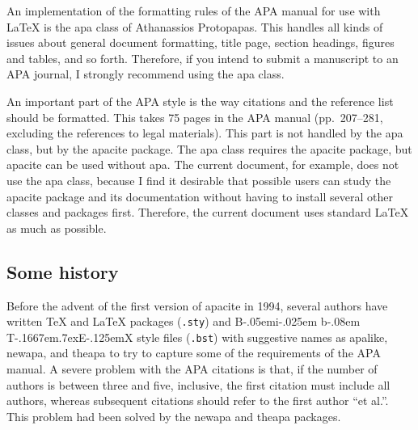 \documentclass{article}
\def\BibTeX{{\rm B\kern-.05em{\sc i\kern-.025em b}\kern-.08em
    T\kern-.1667em\lower.7ex\hbox{E}\kern-.125emX}}%
\newcommand{\pkg}[1]{\textsf{#1}}%
\newcommand{\fname}[1]{\texttt{#1}}%
\begin{document}
An implementation of the formatting rules of the APA manual for use with
\LaTeX{} is the \pkg{apa} class of Athanassios Protopapas. This handles all
kinds of issues about general document formatting, title page, section
headings, figures and tables, and so forth. Therefore, if you intend to submit
a manuscript to an APA journal, I strongly recommend using the \pkg{apa}
class.

An important part of the APA style is the way citations and the reference list
should be formatted. This takes 75 pages in the APA manual (pp.~207--281,
excluding the references to legal materials). This part is not handled by the
\pkg{apa} class, but by the \pkg{apacite} package. The \pkg{apa} class
requires the \pkg{apacite} package, but \pkg{apacite} can be used without
\pkg{apa}. The current document, for example, does not use the \pkg{apa}
class, because I find it desirable that possible users can study the
\pkg{apacite} package and its documentation without having to install several
other classes and packages first. Therefore, the current document uses
standard \LaTeX{} as much as possible.

\subsection*{Some history}
Before the advent of the first version of \pkg{apacite} in 1994, several
authors have written \TeX{} and \LaTeX{} packages (\fname{.sty}) and \BibTeX{}
style files (\fname{.bst}) with suggestive names as \pkg{apalike},
\pkg{newapa}, and \pkg{theapa} to try to capture some of the requirements of
the APA manual. A severe problem with the APA citations is that, if the number
of authors is between three and five, inclusive, the first citation must
include all authors, whereas subsequent citations should refer to the first
author ``et al.''. This problem had been solved by the \pkg{newapa} and
\pkg{theapa} packages.
\end{document}
